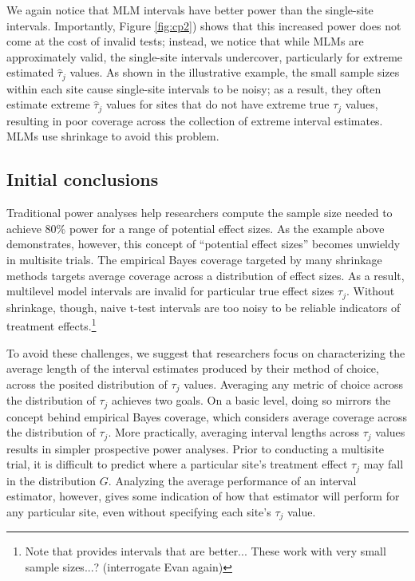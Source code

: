 \documentclass[]{article}
\begin{document}
We again notice that MLM intervals have better power than the single-site intervals.
Importantly, Figure \ref{fig:cp2}) shows that this increased power does not come at the cost of invalid tests; instead, we notice that while MLMs are approximately valid, the single-site intervals undercover, particularly for extreme estimated $\hat{\tau}_j$ values.
As shown in the illustrative example, the small sample sizes within each site cause single-site intervals to be noisy; as a result, they often estimate extreme $\hat{\tau}_j$ values for sites that do not have extreme true $\tau_j$ values, resulting in poor coverage across the collection of extreme interval estimates.
MLMs use shrinkage to avoid this problem.

\subsection{Initial conclusions}

Traditional power analyses help researchers compute the sample size needed to achieve 80\% power for a range of potential effect sizes.
As the example above demonstrates, however, this concept of ``potential effect sizes'' becomes unwieldy in multisite trials.
The empirical Bayes coverage targeted by many shrinkage methods targets average coverage across a distribution of effect sizes.
As a result, multilevel model intervals are invalid for particular true effect sizes $\tau_j$.
Without shrinkage, though, naive t-test intervals are too noisy to be reliable indicators of treatment effects.\footnote{Note that \cite{yu2018adaptive} provides intervals that are better... These work with very small sample sizes...? (interrogate Evan again)}

To avoid these challenges, we suggest that researchers focus on characterizing the average length of the interval estimates produced by their method of choice, across the posited distribution of $\tau_j$ values.
Averaging any metric of choice across the distribution of $\tau_j$ achieves two goals.
On a basic level, doing so mirrors the concept behind empirical Bayes coverage, which considers average coverage across the distribution of $\tau_j$.
More practically, averaging interval lengths across $\tau_j$ values results in simpler prospective power analyses.
Prior to conducting a multisite trial, it is difficult to predict where a particular site's treatment effect $\tau_j$ may fall in the distribution $G$.
Analyzing the average performance of an interval estimator, however, gives some indication of how that estimator will perform for any particular site, even without specifying each site's $\tau_j$ value.
\end{document}
